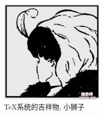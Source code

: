 \documentclass[nofonts]{ctexart}
\begin{document}
\begin{figure}[htp]
	\centering
	\includegraphics[width=5cm]{lady.jpg}
	\caption[小狮子]{\TeX 系统的吉祥物, 小狮子}\label{fig-lion}
\end{figure}
\end{document}
